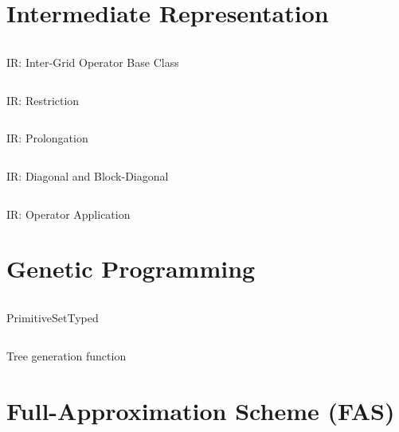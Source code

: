 \section{Intermediate Representation}
\label{appendix:ir}
\begin{listing}[!htb]
	\inputminted{python}{evostencils/ir/inter_grid_operator.py}
	\caption{IR: Inter-Grid Operator Base Class}
	\label{code:ir:inter-grid-operator}
\end{listing}
\begin{listing}[!htb]
	\inputminted{python}{evostencils/ir/restriction.py}
	\caption{IR: Restriction}
	\label{code:ir:restriction}
\end{listing}
\begin{listing}[!htb]
	\inputminted{python}{evostencils/ir/prolongation.py}
	\caption{IR: Prolongation}
	\label{code:ir:prolongation}
\end{listing}
\begin{listing}[!htb]
	\inputminted{python}{evostencils/ir/diagonal.py}
	\caption{IR: Diagonal and Block-Diagonal}
	\label{code:ir:diagonal}
\end{listing}
\begin{listing}[!htb]
	\inputminted{python}{evostencils/ir/multiplication.py}
	\caption{IR: Operator Application}
	\label{code:ir:multiplication}
\end{listing}
\clearpage
\section{Genetic Programming}
\label{appendix:gp}
\begin{listing}[!htb]
	\inputminted{python}{evostencils/gp/primitive_set_typed.py}
	\caption{PrimitiveSetTyped}
	\label{code:gp:primitive-set-typed}
\end{listing}
\begin{listing}[!htb]
	\inputminted{python}{evostencils/gp/generate.py}
	\caption{Tree generation function}
	\label{code:gp:generate}
\end{listing}
\clearpage
\section{Full-Approximation Scheme (FAS)}
\label{appendix:fas}


